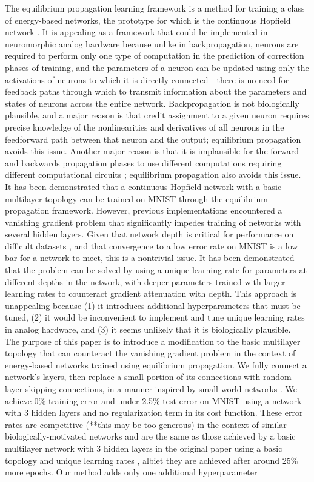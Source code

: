 \documentclass{article}
\newcommand{\npar}{\\\indent}
\begin{document}
The equilibrium propagation learning framework \cite{scellier17} is a method for training a class of energy-based networks, the prototype for which is the continuous Hopfield network \cite{hopfield1984}. It is appealing as a framework that could be implemented in neuromorphic analog hardware because unlike in backpropagation, neurons are required to perform only one type of computation in the prediction of correction phases of training, and the parameters of a neuron can be updated using only the activations of neurons to which it is directly connected - there is no need for feedback paths through which to transmit information about the parameters and states of neurons across the entire network. Backpropagation is not biologically plausible, and a major reason is that credit assignment to a given neuron requires precise knowledge of the nonlinearities and derivatives of all neurons in the feedforward path between that neuron and the output\cite{bengio2015}; equilibrium propagation avoids this issue. Another major reason is that it is implausible for the forward and backwards propagation phases to use different computations requiring different computational circuits \cite{scellier17}; equilibrium propagation also avoids this issue.
\npar
It has been demonstrated \cite{scellier17} that a continuous Hopfield network with a basic multilayer topology can be trained on MNIST \cite{mnist1998} through the equilibrium propagation framework. However, previous implementations encountered a vanishing gradient problem that significantly impedes training of networks with several hidden layers. Given that network depth is critical for performance on difficult datasets \cite{simonyan2014, srivastava2015tvdn}, and that convergence to a low error rate on MNIST is a low bar for a network to meet, this is a nontrivial issue. It has been demonstrated \cite{scellier17} that the problem can be solved by using a unique learning rate for parameters at different depths in the network, with deeper parameters trained with larger learning rates to counteract gradient attenuation with depth. This approach is unappealing because (1) it introduces additional hyperparameters that must be tuned, (2) it would be inconvenient to implement and tune unique learning rates in analog hardware, and (3) it seems unlikely that it is biologically plausible.
\npar
The purpose of this paper is to introduce a modification to the basic multilayer topology that can counteract the vanishing gradient problem in the context of energy-based networks trained using equilibrium propagation. We fully connect a network's layers, then replace a small portion of its connections with random layer-skipping connections, in a manner inspired by small-world networks \cite{watts98}. We achieve 0\% training error and under 2.5\% test error on MNIST using a network with 3 hidden layers and no regularization term in its cost function. These error rates are competitive (**this may be too generous) in the context of similar biologically-motivated networks \cite{bartunov2018} and are the same as those achieved by a basic multilayer network with 3 hidden layers in the original paper using a basic topology and unique learning rates \cite{scellier17}, albiet they are achieved after around 25\% more epochs. Our method adds only one additional hyperparameter
\end{document}
